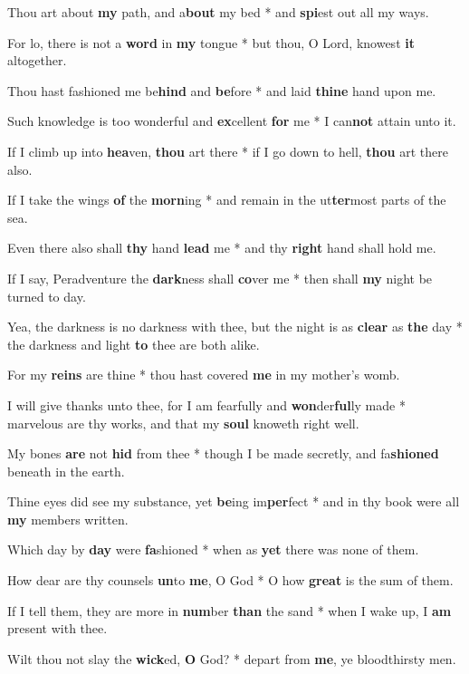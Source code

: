 \begin{multicols}{2}
	Thou art about \textbf{my} path, and a\textbf{bout} my bed * and \textbf{spi}est out all my ways.
	
	For lo, there is not a \textbf{word} in \textbf{my} tongue * but thou, O Lord, knowest \textbf{it} altogether.
	
	Thou hast fashioned me be\textbf{hind} and \textbf{be}fore * and laid \textbf{thine} hand upon me.
	
	Such knowledge is too wonderful and \textbf{ex}cellent \textbf{for} me * I can\textbf{not} attain unto it.
	
	If I climb up into \textbf{hea}ven, \textbf{thou} art there * if I go down to hell, \textbf{thou} art there also.
	
	If I take the wings \textbf{of} the \textbf{morn}ing * and remain in the ut\textbf{ter}most parts of the sea.
	
	Even there also shall \textbf{thy} hand \textbf{lead} me * and thy \textbf{right} hand shall hold me.
	
	If I say, Peradventure the \textbf{dark}ness shall \textbf{co}ver me * then shall \textbf{my} night be turned to day.
	
	Yea, the darkness is no darkness with thee, but the night is as \textbf{clear} as \textbf{the} day * the darkness and light \textbf{to} thee are both alike.
	
	For my \textbf{reins} are thine * thou hast covered \textbf{me} in my mother's womb.
	
	I will give thanks unto thee, for I am fearfully and \textbf{won}der\textbf{ful}ly made * marvelous are thy works, and that my \textbf{soul} knoweth right well.
	
	My bones \textbf{are} not \textbf{hid} from thee * though I be made secretly, and fa\textbf{shioned} beneath in the earth.
	
	Thine eyes did see my substance, yet \textbf{be}ing im\textbf{per}fect * and in thy book were all \textbf{my} members written.
	
	Which day by \textbf{day} were \textbf{fa}shioned * when as \textbf{yet} there was none of them.
	
	How dear are thy counsels \textbf{un}to \textbf{me}, O God * O how \textbf{great} is the sum of them.
	
	If I tell them, they are more in \textbf{num}ber \textbf{than} the sand * when I wake up, I \textbf{am} present with thee.
	
	Wilt thou not slay the \textbf{wick}ed, \textbf{O} God? * depart from \textbf{me}, ye bloodthirsty men.
	

\end{multicols}
